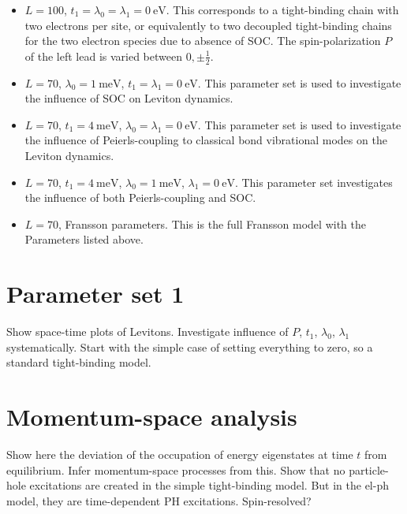 \documentclass{article}
\begin{document}
\begin{itemize}
	\item[Set 1] $L=100$, $t_1=\lambda_0=\lambda_1 = \SI{0}{\electronvolt}$. This corresponds to a tight-binding chain with two electrons per site, or equivalently to two decoupled tight-binding chains for the two electron species due to absence of SOC. The spin-polarization $P$ of the left lead is varied between $0,\pm\frac{1}{2}$.
	\item[Set 2] $L=70$, $\lambda_0 = \SI{1}{\milli\electronvolt}$, $t_1=\lambda_1= \SI{0}{\electronvolt}$. This parameter set is used to investigate the influence of SOC on Leviton dynamics.
	\item[Set 3] $L=70$, $t_1 = \SI{4}{\milli\electronvolt}$, $\lambda_0=\lambda_1= \SI{0}{\electronvolt}$. This parameter set is used to investigate the influence of Peierls-coupling to classical bond vibrational modes on the Leviton dynamics.
	\item[Set 4] $L=70$, $t_1= \SI{4}{\milli\electronvolt}$, $\lambda_0=\SI{1}{\milli\electronvolt}$, $\lambda_1=\SI{0}{\electronvolt}$. This parameter set investigates the influence of both Peierls-coupling and SOC.
	\item[Set 5] $L=70$, Fransson parameters. This is the full Fransson model with the Parameters listed above.
\end{itemize}
\section{Parameter set 1}


Show space-time plots of Levitons. Investigate influence of $P$, $t_1$, $\lambda_0$, $\lambda_1$ systematically. Start with the simple case of setting everything to zero, so a standard tight-binding model.
\section{Momentum-space analysis}
Show here the deviation of the occupation of energy eigenstates at time $t$ from equilibrium. Infer momentum-space processes from this.
Show that no particle-hole excitations are created in the simple tight-binding model. But in the el-ph model, they are time-dependent PH excitations. Spin-resolved? 
\end{document}
